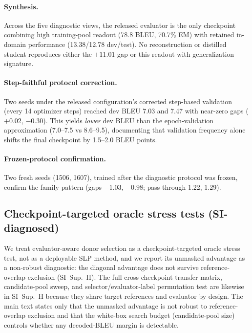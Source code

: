 \documentclass[pdflatex,sn-chicago]{sn-jnl}
\begin{document}
\paragraph{Synthesis.}
Across the five diagnostic views, the released evaluator is the only checkpoint combining high training-pool readout (78.8 BLEU, 70.7\% EM) with retained in-domain performance (13.38/12.78 dev/test). No reconstruction or distilled student reproduces either the $+11.01$ gap or this readout-with-generalization signature.

\paragraph{Step-faithful protocol correction.}
\label{sec:stepfaithful}
Two seeds under the released configuration's corrected step-based validation (every 14 optimizer steps) reached dev BLEU 7.03 and 7.47 with near-zero gaps ($+0.02$, $-0.30$). This yields \emph{lower} dev BLEU than the epoch-validation approximation (7.0--7.5 vs 8.6--9.5), documenting that validation frequency alone shifts the final checkpoint by 1.5--2.0 BLEU points.

\paragraph{Frozen-protocol confirmation.}
Two fresh seeds (1506, 1607), trained after the diagnostic protocol was frozen, confirm the family pattern (gaps $-1.03$, $-0.98$; pass-through 1.22, 1.29).

\subsection{Checkpoint-targeted oracle stress tests (SI-diagnosed)}
\label{sec:non-bleu-audit}
\label{sec:bt_likelihood_attack}

We treat evaluator-aware donor selection as a checkpoint-targeted oracle stress test, not as a deployable SLP method, and we report its unmasked advantage as a non-robust diagnostic: the diagonal advantage does not survive reference-overlap exclusion (SI~Sup.~H). The full cross-checkpoint transfer matrix, candidate-pool sweep, and selector/evaluator-label permutation test are likewise in SI~Sup.~H because they share target references and evaluator by design. The main text states only that the unmasked advantage is not robust to reference-overlap exclusion and that the white-box search budget (candidate-pool size) controls whether any decoded-BLEU margin is detectable.
\end{document}
